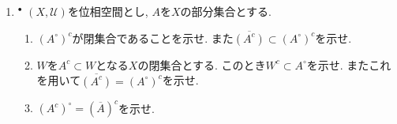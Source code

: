 \documentclass[dvipdfmx,a4paper,11pt]{article}
\newcommand{\R}{\mathbb{R}}
\newcommand{\Q}{\mathbb{Q}}
\theoremstyle{definition}
\begin{document}
\begin{enumerate}[label=\textbf{問}\ref*{sec-subspace}.\arabic*]
\item $^\bullet$ $(X, \mathscr{U})$を位相空間とし, $A$を$X$の部分集合とする. 
\begin{enumerate}
\setlength{\parskip}{0cm} 
  \setlength{\itemsep}{0cm} 
\item $(A^{\circ})^{c}$が閉集合であることを示せ. また$\overline{(A^c)} \subset  (A^{\circ})^c$を示せ.
\item $W$を$A^c \subset W$となる$X$の閉集合とする. このとき$W^c \subset A^{\circ}$を示せ. またこれを用いて$\overline{(A^c)} =  (A^{\circ})^c$を示せ. 
\item $(A^c)^{\circ}= (\overline{A})^c$を示せ.
\end{enumerate}





	





\end{enumerate}
\end{document}
